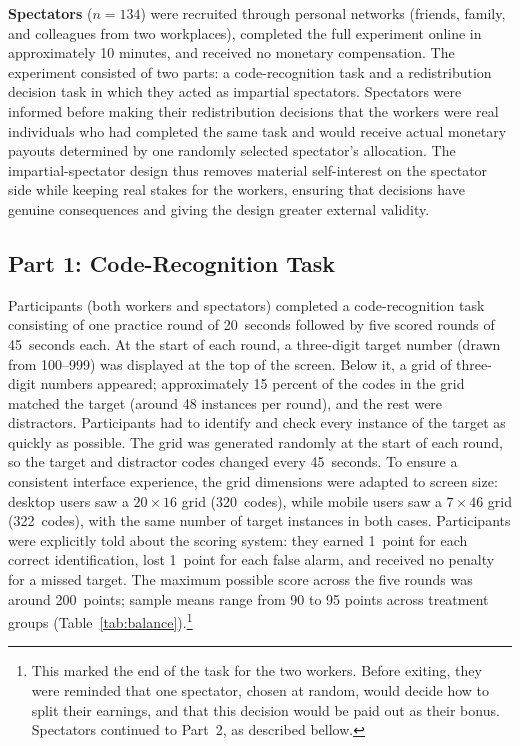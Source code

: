 \documentclass[12pt]{article}
\begin{document}
\textbf{Spectators} ($n = 134$) were recruited through personal networks
(friends, family, and colleagues from two workplaces), completed the full
experiment online in approximately 10 minutes, and received no monetary
compensation.
The experiment consisted of two parts: a code-recognition task and a
redistribution decision task in which they acted as impartial spectators.
Spectators were informed before making their redistribution decisions that the
workers were real individuals who had completed the same task and would
receive actual monetary payouts determined by one randomly selected
spectator's allocation.
The impartial-spectator design thus removes material self-interest on the
spectator side while keeping real stakes for the workers, ensuring that
decisions have genuine consequences and giving the design greater external
validity.

\subsection{Part 1: Code-Recognition Task}

Participants (both workers and spectators) completed a code-recognition task
consisting of one practice round of 20~seconds followed by five scored rounds
of 45~seconds each.
At the start of each round, a three-digit target number (drawn from 100--999)
was displayed at the top of the screen.
Below it, a grid of three-digit numbers appeared; approximately 15 percent
of the codes in the grid matched the target (around 48 instances per round),
and the rest were distractors.
Participants had to identify and check every instance of the target as
quickly as possible.
The grid was generated randomly at the start of each round, so the target
and distractor codes changed every 45~seconds.
To ensure a consistent interface experience, the grid dimensions were
adapted to screen size: desktop users saw a $20 \times 16$ grid (320~codes),
while mobile users saw a $7 \times 46$ grid (322~codes), with the same
number of target instances in both cases.
Participants were explicitly told about the scoring system: they earned
1~point for each correct identification, lost 1~point for each false alarm,
and received no penalty for a missed target.
The maximum possible score across the five rounds was around 200~points; sample
means range from 90 to 95 points across treatment groups
(Table~\ref{tab:balance}).\footnote{This marked the end of the task for
the two workers. Before exiting, they were reminded that one spectator,
chosen at random, would decide how to split their earnings, and that this
decision would be paid out as their bonus. Spectators continued to Part~2,
as described bellow.}
\end{document}
